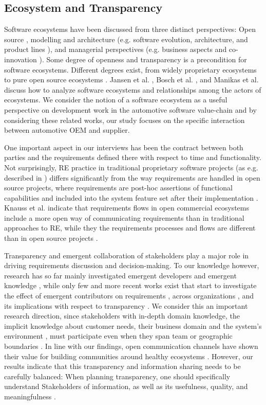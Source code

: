 \subsection{Ecosystem and Transparency}
Software ecosystems have been discussed from three distinct perspectives: Open source
\cite{Scacchi2009}, modelling and architecture (e.g. software evolution, architecture, and product lines \cite{Bosch2009}), and managerial perspectives (e.g. business aspects and co-innovation \cite{Jansen2012b}). 
Some degree of openness and transparency is a precondition for software ecosystems. Different degrees exist, from widely proprietary ecosystems to pure open source ecosystems \cite{Angeren2012,Jansen2012c}.
Jansen et al. \cite{Jansen2012a}, Bosch et al. \cite{Bosch2009}, and Manikas et al. \cite{Manikas2013b} discuss how to analyze software ecosystems and relationships among the actors of ecosystems. 
We consider the notion of a software ecosystem as a useful perspective on development work in the automotive software value-chain \cite{Knauss2014d} and by considering these related works, our study focuses on the specific interaction between automotive OEM and supplier.

One important aspect in our interviews has been the contract between both parties and the requirements defined there with respect to time and functionality. 
Not surprisingly, RE practice in traditional proprietary software projects (as e.g. described in \cite{Robertson1999,Ruhe2010}) differs significantly from the way requirements are handled in open source projects, where requirements are post-hoc assertions of functional capabilities and included into the system feature set after their implementation \cite{Scacchi2009}.
Knauss et al. indicate that requirements flows in open commercial ecosystems include a more open way of communicating requirements than in traditional approaches to RE, while they the requirements processes and flows are different than in open source projects \cite{KYB+2016}. 


Transparency and emergent collaboration of stakeholders play a major role in driving requirements discussion and decision-making.
To our knowledge however, research has so far mainly investigated emergent developers \cite{Minto2007,Haenni2014,Sadi2015} and emergent knowledge \cite{Treude2012}, while only few and more recent works exist that start to investigate the effect of emergent contributors on requirements \cite{Kwan2011}, across organizations \cite{Linaker2016,KYB+2016}, and its implications with respect to transparency \cite{Dabbish2013,Hosseini2016}. 
We consider this an important research direction, since stakeholders with in-depth domain knowledge, the implicit knowledge about customer needs, their business domain and the system’s environment \cite{Damian2013}, must participate even when they span team or geographic boundaries \cite{boden2009bridging}.
In line with our findings, open communication channels have shown their value for building communities around healthy ecosystems  \cite{Kilamo2012}.
However, our results indicate that this transparency and information sharing needs to be carefully balanced: When planning transparency, one should specifically understand Stakeholders of information, as well as its usefulness, quality, and meaningfulness \cite{Hosseini2016}.